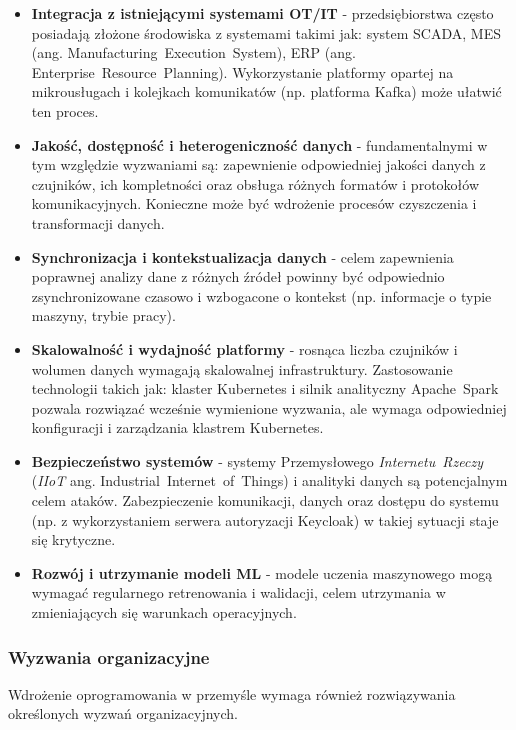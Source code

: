\begin{itemize}
    \item \textbf{Integracja z istniejącymi systemami OT/IT} - przedsiębiorstwa często posiadają złożone środowiska z systemami takimi jak: system SCADA, MES (ang. \mbox{Manufacturing Execution System}), ERP (ang. \mbox{Enterprise Resource Planning}). Wykorzystanie platformy opartej na mikrousługach i kolejkach komunikatów (np. platforma Kafka) może ułatwić ten proces.
    \item \textbf{Jakość, dostępność i heterogeniczność danych} - fundamentalnymi w tym względzie wyzwaniami są:  zapewnienie odpowiedniej jakości danych z czujników, ich kompletności oraz obsługa różnych formatów i protokołów komunikacyjnych. Konieczne może być wdrożenie procesów czyszczenia i transformacji danych.
    \item \textbf{Synchronizacja i kontekstualizacja danych} - celem zapewnienia poprawnej analizy dane z różnych źródeł powinny być odpowiednio zsynchronizowane czasowo i wzbogacone o kontekst (np. informacje o typie maszyny, trybie pracy).
    \item \textbf{Skalowalność i wydajność platformy} - rosnąca liczba czujników i wolumen danych wymagają skalowalnej infrastruktury. Zastosowanie technologii takich jak: klaster Kubernetes i silnik analityczny \mbox{Apache Spark} pozwala rozwiązać wcześnie wymienione wyzwania, ale wymaga odpowiedniej konfiguracji i zarządzania klastrem Kubernetes.
    \item \textbf{Bezpieczeństwo systemów} - systemy Przemysłowego \mbox{\textit{Internetu Rzeczy}} \\ (\mbox{\textit{IIoT}} ang. \mbox{Industrial Internet of Things}) i analityki danych są potencjalnym celem ataków. Zabezpieczenie komunikacji, danych oraz dostępu do systemu (np. z wykorzystaniem serwera autoryzacji Keycloak) w takiej sytuacji staje się krytyczne.
    \item \textbf{Rozwój i utrzymanie modeli ML} - modele uczenia maszynowego mogą wymagać regularnego retrenowania i walidacji, celem utrzymania w zmieniających się warunkach operacyjnych.
\end{itemize}

\subsubsection{Wyzwania organizacyjne}
\label{subsubsec:wyzwania_organizacyjne}

Wdrożenie oprogramowania w przemyśle wymaga również rozwiązywania określonych wyzwań organizacyjnych.

